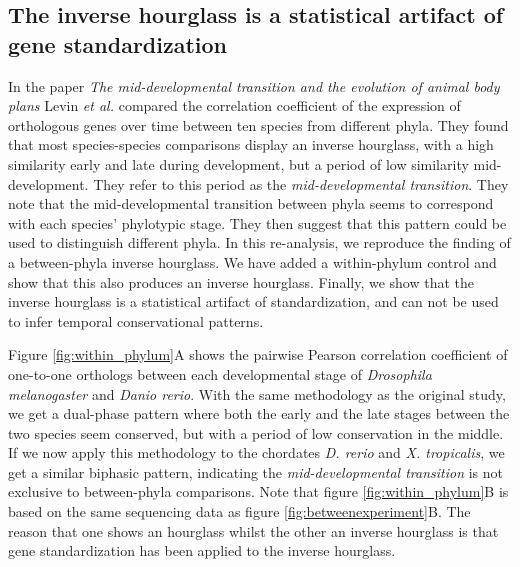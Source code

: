 \subsection{The inverse hourglass is a statistical artifact of gene standardization} \label{subsection:levin}

In the paper \textit{The mid-developmental transition and the evolution of animal body plans}\cite{Levin2016} Levin \textit{et al.} compared the correlation coefficient of the expression of orthologous genes over time between ten species from different phyla. They found that most species-species comparisons display an inverse hourglass, with a high similarity early and late during development, but a period of low similarity mid-development. They refer to this period as the \textit{mid-developmental transition}. They note that the mid-developmental transition between phyla seems to correspond with each species' phylotypic stage. They then suggest that this pattern could be used to distinguish different phyla. In this re-analysis, we reproduce the finding of a between-phyla inverse hourglass. We have added a within-phylum control and show that this also produces an inverse hourglass. Finally, we show that the inverse hourglass is a statistical artifact of standardization, and can not be used to infer temporal conservational patterns.

Figure \ref{fig:within_phylum}A shows the pairwise Pearson correlation coefficient of one-to-one orthologs between each developmental stage of \textit{Drosophila melanogaster} and \textit{Danio rerio}. With the same methodology as the original study, we get a dual-phase pattern where both the early and the late stages between the two species seem conserved, but with a period of low conservation in the middle. If we now apply this methodology to the chordates \textit{D. rerio} and \textit{X. tropicalis}, we get a similar biphasic pattern, indicating the \textit{mid-developmental transition} is not exclusive to between-phyla comparisons. Note that figure \ref{fig:within_phylum}B is based on the same sequencing data as figure \ref{fig:betweenexperiment}B. The reason that one shows an hourglass whilst the other an inverse hourglass is that gene standardization has been applied to the inverse hourglass.

